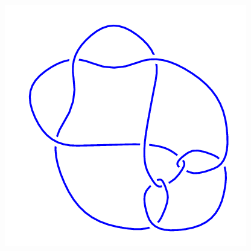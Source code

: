 \begin{figure}[H]
\begin{minipage}[b]{.18\linewidth}
    \end{minipage}
    \begin{minipage}[b]{.18\linewidth}
        \centering
        \includegraphics[width=\linewidth]{../data/10_141.png}
    \end{minipage}
\end{figure}
